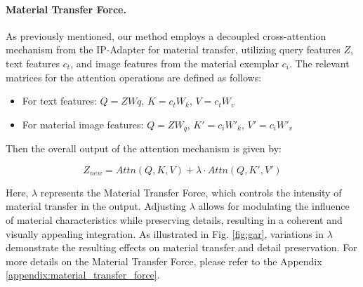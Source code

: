 \paragraph{Material Transfer Force.}
As previously mentioned, our method employs a decoupled cross-attention mechanism from the IP-Adapter for material transfer, utilizing query features $Z$, text features $c_t$, and image features from the material exemplar $c_i$. The relevant matrices for the attention operations are defined as follows:
\begin{itemize}
\item For text features: $Q = ZWq$, $K = c_tW_k$, $V = c_tW_v$
\item For material image features: $Q = ZW_q$, $K' = c_iW'_k$, $V' = c_iW'_v$
\end{itemize}
Then the overall output of the attention mechanism is given by:

\begin{equation}
Z_{new} = Attn(Q, K, V) +
\lambda \cdot Attn(Q, K', V')
  \label{eq:attn}
\end{equation}

Here, $\lambda$ represents the Material Transfer Force, which controls the intensity of material transfer in the output. Adjusting $\lambda$ allows for modulating the influence of material characteristics while preserving details, resulting in a coherent and visually appealing integration. As illustrated in Fig. \ref{fig:gar}, variations in $\lambda$ demonstrate the resulting effects on material transfer and detail preservation.
For more details on the Material Transfer Force, please refer to the Appendix \ref{appendix:material_transfer_force}.
